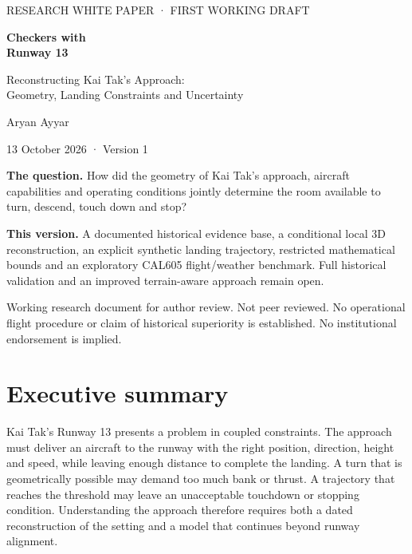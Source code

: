 \documentclass[11pt,a4paper]{article}
\begin{document}
\hypersetup{pageanchor=false}
\begin{titlepage}
\vspace*{18mm}
{\large\color{sage}RESEARCH WHITE PAPER · FIRST WORKING DRAFT\par}
\vspace{12mm}
{\fontsize{34}{39}\selectfont\bfseries\color{slate}Checkers with\\Runway 13\par}
\vspace{8mm}
{\Large Reconstructing Kai Tak's Approach:\\Geometry, Landing Constraints and Uncertainty\par}
\vspace{15mm}
{\large Aryan Ayyar\par}
{13 October 2026 · Version 1\par}
\vspace{12mm}
\begin{minipage}{0.92\textwidth}
\textbf{The question.} How did the geometry of Kai Tak's approach, aircraft capabilities and operating conditions jointly determine the room available to turn, descend, touch down and stop?

\textbf{This version.} A documented historical evidence base, a conditional local 3D reconstruction, an explicit synthetic landing trajectory, restricted mathematical bounds and an exploratory CAL605 flight/weather benchmark. Full historical validation and an improved terrain-aware approach remain open.
\end{minipage}
\vfill
{\small Working research document for author review. Not peer reviewed. No operational flight procedure or claim of historical superiority is established. No institutional endorsement is implied.\par}
\end{titlepage}
\hypersetup{pageanchor=true}

\section*{Executive summary}
Kai Tak's Runway 13 presents a problem in coupled constraints. The approach must deliver an aircraft to the runway with the right position, direction, height and speed, while leaving enough distance to complete the landing. A turn that is geometrically possible may demand too much bank or thrust. A trajectory that reaches the threshold may leave an unacceptable touchdown or stopping condition. Understanding the approach therefore requires both a dated reconstruction of the setting and a model that continues beyond runway alignment.
\end{document}
